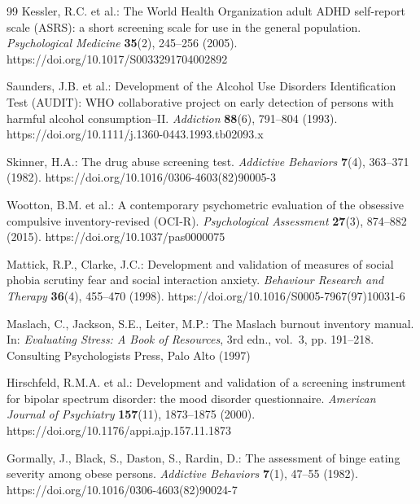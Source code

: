 \documentclass{svproc}
\begin{document}
\begin{thebibliography}{99}
 Kessler, R.C. et al.: The World Health Organization adult ADHD self-report scale (ASRS): a short screening scale for use in the general population. \textit{Psychological Medicine} \textbf{35}(2), 245--256 (2005). https://doi.org/10.1017/S0033291704002892

 Saunders, J.B. et al.: Development of the Alcohol Use Disorders Identification Test (AUDIT): WHO collaborative project on early detection of persons with harmful alcohol consumption--II. \textit{Addiction} \textbf{88}(6), 791--804 (1993). https://doi.org/10.1111/j.1360-0443.1993.tb02093.x

 Skinner, H.A.: The drug abuse screening test. \textit{Addictive Behaviors} \textbf{7}(4), 363--371 (1982). https://doi.org/10.1016/0306-4603(82)90005-3

 Wootton, B.M. et al.: A contemporary psychometric evaluation of the obsessive compulsive inventory-revised (OCI-R). \textit{Psychological Assessment} \textbf{27}(3), 874--882 (2015). https://doi.org/10.1037/pas0000075

 Mattick, R.P., Clarke, J.C.: Development and validation of measures of social phobia scrutiny fear and social interaction anxiety. \textit{Behaviour Research and Therapy} \textbf{36}(4), 455--470 (1998). https://doi.org/10.1016/S0005-7967(97)10031-6

 Maslach, C., Jackson, S.E., Leiter, M.P.: The Maslach burnout inventory manual. In: \textit{Evaluating Stress: A Book of Resources}, 3rd edn., vol.~3, pp. 191--218. Consulting Psychologists Press, Palo Alto (1997)

 Hirschfeld, R.M.A. et al.: Development and validation of a screening instrument for bipolar spectrum disorder: the mood disorder questionnaire. \textit{American Journal of Psychiatry} \textbf{157}(11), 1873--1875 (2000). https://doi.org/10.1176/appi.ajp.157.11.1873

 Gormally, J., Black, S., Daston, S., Rardin, D.: The assessment of binge eating severity among obese persons. \textit{Addictive Behaviors} \textbf{7}(1), 47--55 (1982). https://doi.org/10.1016/0306-4603(82)90024-7

\end{thebibliography}
\end{document}
